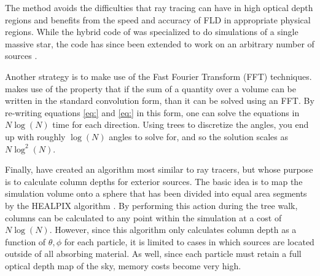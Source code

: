 The method avoids the difficulties that ray tracing can have in high optical depth regions and benefits from the speed and accuracy of FLD in appropriate physical regions. While the hybrid code of \citet{kuiperEt10} was specialized to do simulations of a single massive star, the code has since been extended to work on an arbitrary number of sources \citep{klassenEt2014}.

Another strategy is to make use of the Fast Fourier Transform (FFT) techniques. \citet{cen02} makes use of the property that if the sum of a quantity over a volume can be written in the standard convolution form, than it can be solved using an FFT. By re-writing equations \ref{eq:} and \ref{eq:} in this form, one can solve the equations in $N\log(N)$ time for each direction. Using trees to discretize the angles, you end up with roughly $\log(N)$ angles to solve for, and so the solution scales as $N\log^2(N)$.

Finally, \citet{clarkEt12} have created an algorithm most similar to ray tracers, but whose purpose is to calculate column depths for exterior sources. The basic idea is to map the simulation volume onto a sphere that has been divided into equal area segments by the HEALPIX algorithm \citep{gorskiEt05}. By performing this action during the tree walk, columns can be calculated to any point within the simulation at a cost of $N\log(N)$. However, since this algorithm only calculates column depth as a function of $\theta, \phi$ for each particle, it is limited to cases in which sources are located outside of all absorbing material. As well, since each particle must retain a full optical depth map of the sky, memory costs become very high.


%
%

